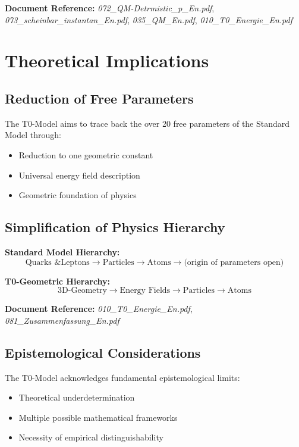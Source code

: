 \textbf{Document Reference:} \textit{072\_QM-Detrmistic\_p\_En.pdf}, \textit{073\_scheinbar\_instantan\_En.pdf}, \textit{035\_QM\_En.pdf}, \textit{010\_T0\_Energie\_En.pdf}

\section{Theoretical Implications}

\subsection{Reduction of Free Parameters}

The T0-Model aims to trace back the over 20 free parameters of the Standard Model through:

\begin{itemize}
	\item Reduction to one geometric constant
	\item Universal energy field description
	\item Geometric foundation of physics
\end{itemize}

\subsection{Simplification of Physics Hierarchy}

\textbf{Standard Model Hierarchy:}
\begin{equation}
	\text{Quarks \& Leptons} \rightarrow \text{Particles} \rightarrow \text{Atoms} \rightarrow \text{(origin of parameters open)}
\end{equation}

\textbf{T0-Geometric Hierarchy:}
\begin{equation}
	\text{3D-Geometry} \rightarrow \text{Energy Fields} \rightarrow \text{Particles} \rightarrow \text{Atoms}
\end{equation}

\textbf{Document Reference:} \textit{010\_T0\_Energie\_En.pdf}, \textit{081\_Zusammenfassung\_En.pdf}

\subsection{Epistemological Considerations}

The T0-Model acknowledges fundamental epistemological limits:
\begin{itemize}
	\item Theoretical underdetermination
	\item Multiple possible mathematical frameworks
	\item Necessity of empirical distinguishability
\end{itemize}

